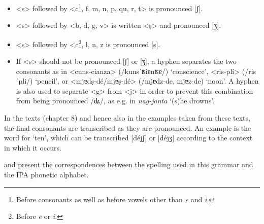 {\begin{itemize}
	\item <s> followed by <c\footnote{Before consonants as well as before vowels other than \textit{e} and \textit{i}.}, f, m, n, p, qu, r, t> is pronounced [ʃ].
	\item <s> followed by <b, d, g, v> is written <ṣ> and pronounced [ʒ].
	\item <s> followed by <c\footnote{Before \textit{e} or \textit{i}.}, l, n, z is pronounced [s].
	\item If <s> should not be pronounced [ʃ] or [ʒ], a hyphen separates the two consonants as in <cuns-cianza> (/kunsˈʦiɐnʦɐ/) `conscience', <ris-plí> (/risˈpli/) `pencil', or <mjɐdṣ-dé/mjɐṣ-dé> (/mjɐdz-de, mjɐz-de) `noon'. A hyphen is also used to separate <g> from <j> in order to prevent this combination from being pronounced /ʥ/, as e.g. in \textit{nag-janta} `(s)he drowns'.
\end{itemize}

In the texts (chapter 8) and hence also in the examples taken from these texts, the final consonants are transcribed as they are pronounced. An example is the word for `ten', which can be transcribed [déjʃ] or [déjʒ] according to the context in which it occurs.

 and  present the correspondences between the spelling used in this grammar and the IPA phonetic alphabet.


}
